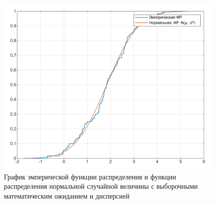 \begin{figure}[h]
	\centering
	\includegraphics[scale=0.5]{images/dist_func.png}
	\caption{График эмперической функции распределения и функции распределения нормальной случайной величины с выборочными математическим ожиданием и дисперсией}
	\label{fig:emperic}
\end{figure}
